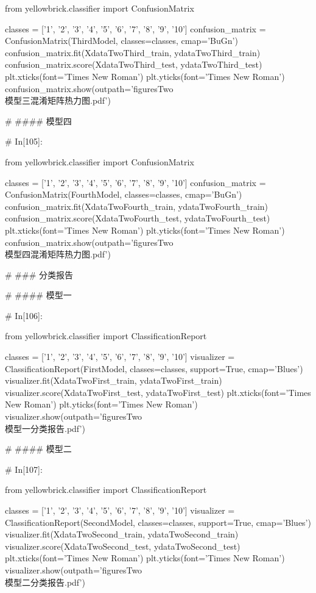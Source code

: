 \documentclass{MathorCupmodeling}
\begin{document}
\begin{python}
	
	from yellowbrick.classifier import ConfusionMatrix
	
	classes = ['1', '2', '3', '4', '5', '6', '7', '8', '9', '10']
	confusion_matrix = ConfusionMatrix(ThirdModel, classes=classes, cmap='BuGn')
	confusion_matrix.fit(XdataTwoThird_train, ydataTwoThird_train)
	confusion_matrix.score(XdataTwoThird_test, ydataTwoThird_test)
	plt.xticks(font='Times New Roman')
	plt.yticks(font='Times New Roman')
	confusion_matrix.show(outpath='figuresTwo\\[附件2]模型三混淆矩阵热力图.pdf')
	
	# #### 模型四
	
	# In[105]:
	
	
	from yellowbrick.classifier import ConfusionMatrix
	
	classes = ['1', '2', '3', '4', '5', '6', '7', '8', '9', '10']
	confusion_matrix = ConfusionMatrix(FourthModel, classes=classes, cmap='BuGn')
	confusion_matrix.fit(XdataTwoFourth_train, ydataTwoFourth_train)
	confusion_matrix.score(XdataTwoFourth_test, ydataTwoFourth_test)
	plt.xticks(font='Times New Roman')
	plt.yticks(font='Times New Roman')
	confusion_matrix.show(outpath='figuresTwo\\[附件2]模型四混淆矩阵热力图.pdf')
	
	# ### 分类报告
	
	# #### 模型一
	
	# In[106]:
	
	
	from yellowbrick.classifier import ClassificationReport
	
	classes = ['1', '2', '3', '4', '5', '6', '7', '8', '9', '10']
	visualizer = ClassificationReport(FirstModel, classes=classes, support=True, cmap='Blues')
	visualizer.fit(XdataTwoFirst_train, ydataTwoFirst_train)
	visualizer.score(XdataTwoFirst_test, ydataTwoFirst_test)
	plt.xticks(font='Times New Roman')
	plt.yticks(font='Times New Roman')
	visualizer.show(outpath='figuresTwo\\[附件2]模型一分类报告.pdf')
	
	# #### 模型二
	
	# In[107]:
	
	
	from yellowbrick.classifier import ClassificationReport
	
	classes = ['1', '2', '3', '4', '5', '6', '7', '8', '9', '10']
	visualizer = ClassificationReport(SecondModel, classes=classes, support=True, cmap='Blues')
	visualizer.fit(XdataTwoSecond_train, ydataTwoSecond_train)
	visualizer.score(XdataTwoSecond_test, ydataTwoSecond_test)
	plt.xticks(font='Times New Roman')
	plt.yticks(font='Times New Roman')
	visualizer.show(outpath='figuresTwo\\[附件2]模型二分类报告.pdf')
	

\end{python}
\end{document}
